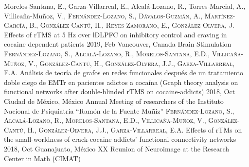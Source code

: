 {
\setlength\tabcolsep{0pt} \setlength{\extrarowheight}{0pt}%
\begin{itemize}[leftmargin=5ex, nosep, noitemsep, itemindent=-13pt,
    label=\raisebox{0.25ex}{\tiny$\bullet$}]%
    \vspace{-1.8mm}%
    \cvposter
        {Morelos-Santana, E., Garza-Villarreal, E., Alcalá-Lozano, R.,
            Torres-Marcial, A., Villicaña-Muñoz, V., \scshape{Fernández-Lozano,
            S.}, Dávalos-Guzmán, A., Martínez-García, B., González-Cantú, H.,
            Reyes-Zamorano, E., González-Olvera, J.}
        {Effects of rTMS at 5 Hz over lDLPFC on inhibitory control and craving
            in cocaine dependent patients}
        {2019, Feb}
        {Vancouver, Canada}
        {Brain Stimulation}
    \cvposter
        {\scshape{Fernández-Lozano, S.}, Alcalá-Lozano, R., Morelos-Santana, E.D.,
            Villicaña-Muñoz, V., González-Cantú, H., González-Olvera, J.J.,
        Garza-Villarreal, E.A.}
        {Análisis de teoría de grafos en redes funcionales después de un
            tratamiento doble ciego de EMTr en pacientes adictos a cocaína
            (Graph theory analysis on functional networks after double-blinded
        rTMS on cocaine-addicts)}
        {2018, Oct}
        {Ciudad de México, México}
        {Annual Meeting of researchers of the Instituto Nacional de Psiquiatría ``Ramón de la Fuente Muñiz''}
    \cvposter
        {\scshape{Fernández-Lozano, S.}, Alcalá-Lozano, R., Morelos-Santana, E.D.,
            Villicaña-Muñoz, V., González-Cantú, H., González-Olvera, J.J.,
        Garza-Villarreal, E.A.}
        {Effects of rTMs on the small-worldness of crack-cocaine addicts' functional connectivity networks}
        {2018, Oct}
        {Guanajuato, México}
        {XX Reunion of Neuroimage at the Research Center in Math (CIMAT)}
\end{itemize}
}
